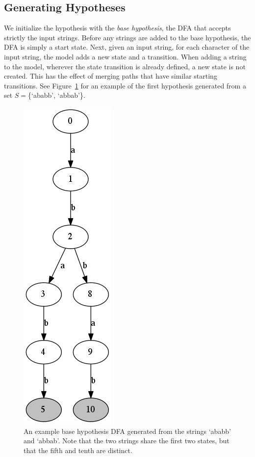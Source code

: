 \documentclass[10pt,letterpaper]{article}
\begin{document}

\subsection{Generating Hypotheses}
We initialize the hypothesis with the \emph{base hypothesis}, the DFA that accepts strictly the input strings. Before any strings are added to the base hypothesis, the DFA is simply a start state. Next, given an input string, for each character of the input string, the model adds a new state and a transition. When adding a string to the model, wherever the state transition is already defined, a new state is not created. This has the effect of merging paths that have similar starting transitions. See Figure~\ref{base_hypothesis} for an example of the first hypothesis generated from a set $S = $\{`ababb', `abbab'\}. 

\begin{figure}[ht]
\begin{center}
\includegraphics[scale=0.4]{base_hypothesis.png}
\end{center}
\caption{An example base hypothesis DFA generated from the strings `ababb' and `abbab'. Note that the two strings share the first two states, but that the fifth and tenth are distinct.} 
\label{base_hypothesis}
\end{figure}
\end{document}
